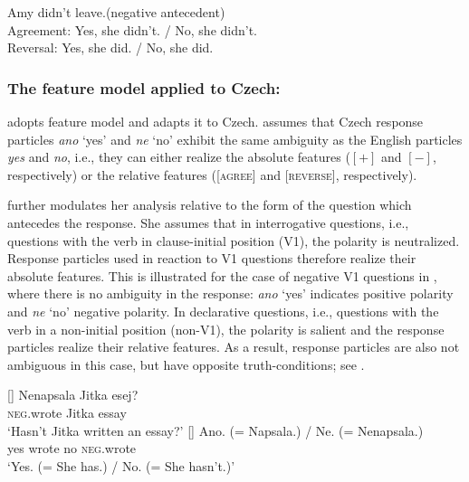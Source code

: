 \documentclass[output=paper,colorlinks,citecolor=brown]{langscibook}
\begin{document}
\begin{exe}
\ex \label{hrdsim:ex:negativeantecedent}
Amy didn't leave.\hfill ({negative antecedent})\\
Agreement: Yes, she didn't. / No, she didn't.\\
Reversal: Yes, she did. / No, she did.\\
\end{exe}

\subsubsection{The feature model applied to Czech: \citet{gruet2016yes}}\label{hrdsim:sec:czechresponse}

\citet{gruet2016yes} adopts  feature model and adapts it to Czech. \citeauthor{gruet2016yes} assumes that Czech response particles \textit{ano} `yes' and \textit{ne} `no' exhibit the same ambiguity as the English particles \textit{yes} and \textit{no}, i.e., they can either realize the absolute features ($[+]$ and $[-]$, respectively) or the relative features ([\textsc{agree}] and [\textsc{reverse}], respectively).

\citet{gruet2016yes} further modulates her analysis relative to the form of the question which antecedes the response. She assumes that in interrogative questions, i.e., questions with the verb in clause-initial position (V1), the polarity is neutralized. Response particles used in reaction to V1 questions therefore realize their absolute features. This is illustrated for the case of negative V1 questions in , where there is no ambiguity in the response: \textit{ano} `yes' indicates positive polarity and \textit{ne} `no' negative polarity. In declarative questions, i.e., questions with the verb in a non-initial position (non-V1), the polarity is salient and the response particles realize their relative features. As a result, response particles are also not ambiguous in this case, but have opposite truth-conditions; see .

\begin{exe}
\label{hrdsim:ex:v1}
\begin{xlist}
[]{ 
\gll    Nenapsala Jitka esej?\\
        \textsc{neg}.wrote Jitka essay\\
        \glt ‘Hasn't Jitka written an essay?'}
[]{
\gll Ano. (= Napsala.) / Ne. (= Nenapsala.)\\
yes {} wrote {} no {} \textsc{neg}.wrote\\
\glt   ‘Yes. (= She has.) / No. (= She hasn't.)' 
}
\end{xlist}
\end{exe}
\end{document}
